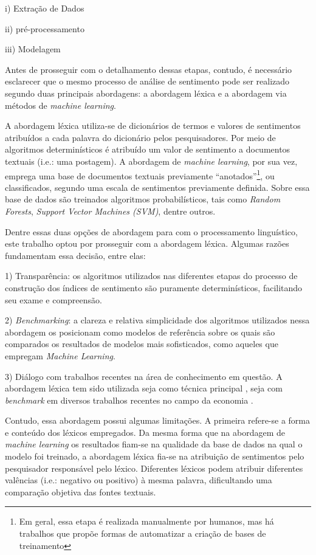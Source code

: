 i) Extração de Dados

ii) pré-processamento

iii) Modelagem

Antes de prosseguir com o detalhamento dessas etapas, contudo, é necessário esclarecer que o mesmo processo de análise de sentimento pode ser realizado segundo duas principais abordagens: a abordagem léxica e a abordagem via métodos de \textit{machine learning}.

A abordagem léxica utiliza-se de dicionários de termos e valores de sentimentos atribuídos a cada palavra do dicionário pelos pesquisadores. Por meio de algoritmos determinísticos é atribuído um valor de sentimento a documentos textuais (i.e.: uma postagem). A abordagem de \textit{machine learning}, por sua vez, emprega uma base de documentos textuais previamente \enquote{anotados}\footnote{Em geral, essa etapa é realizada manualmente por humanos, mas há trabalhos que propõe formas de automatizar a criação de bases de treinamento}, ou classificados, segundo uma escala de sentimentos previamente definida. Sobre essa base de dados são treinados algoritmos probabilísticos, tais como \textit{Random Forests}, \textit{Support Vector Machines (SVM)}, dentre outros.

Dentre essas duas opções de abordagem para com o processamento linguístico, este trabalho optou por prosseguir com a abordagem léxica. Algumas razões fundamentam essa decisão, entre elas:

1) Transparência: os algoritmos utilizados nas diferentes etapas do processo de construção dos índices de sentimento são puramente determinísticos, facilitando seu exame e compreensão. 

2) \textit{Benchmarking}: a clareza e relativa simplicidade dos algoritmos utilizados nessa abordagem os posicionam como modelos de referência sobre os quais são comparados os resultados de modelos mais sofisticados, como aqueles que empregam \textit{Machine Learning}.

3) Diálogo com trabalhos recentes na área de conhecimento em questão. A abordagem léxica tem sido utilizada seja como técnica principal \parencite{avanco_lexicon-based_2014, shapiro_taking_2021, gardner_words_2021, picault_media_2022}, seja com \textit{benchmark} em diversos trabalhos recentes no campo da economia \parencite{shapiro_measuring_2020, nyman_news_2021}. 

Contudo, essa abordagem possui algumas limitações. A primeira refere-se a forma e conteúdo dos léxicos empregados. Da mesma forma que na abordagem de \textit{machine learning} os resultados fiam-se na qualidade da base de dados na qual o modelo foi treinado, a abordagem léxica fia-se na atribuição de sentimentos pelo pesquisador responsável pelo léxico. Diferentes léxicos podem atribuir diferentes valências (i.e.: negativo ou positivo) à mesma palavra, dificultando uma comparação objetiva das fontes textuais.

